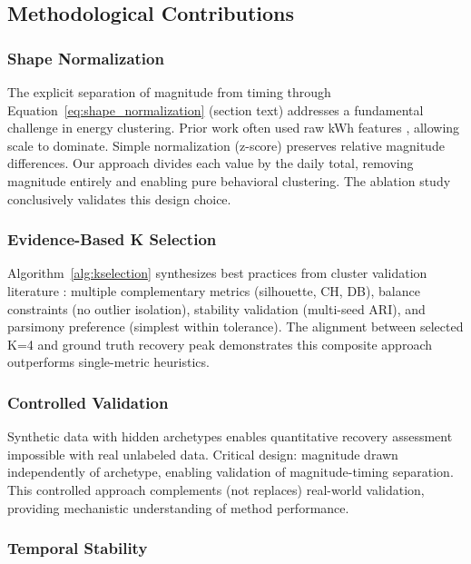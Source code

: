 \subsection{Methodological Contributions}

\subsubsection{Shape Normalization}

The explicit separation of magnitude from timing through Equation~\ref{eq:shape_normalization} (section text) addresses a fundamental challenge in energy clustering. Prior work often used raw kWh features \cite{kwac2014household,rhodes2014clustering}, allowing scale to dominate. Simple normalization (z-score) preserves relative magnitude differences. Our approach divides each value by the daily total, removing magnitude entirely and enabling pure behavioral clustering. The ablation study conclusively validates this design choice.

\subsubsection{Evidence-Based K Selection}

Algorithm~\ref{alg:kselection} synthesizes best practices from cluster validation literature \cite{hennig2020comparing,gates2019adjusted}: multiple complementary metrics (silhouette, CH, DB), balance constraints (no outlier isolation), stability validation (multi-seed ARI), and parsimony preference (simplest within tolerance). The alignment between selected K=4 and ground truth recovery peak demonstrates this composite approach outperforms single-metric heuristics.

\subsubsection{Controlled Validation}

Synthetic data with hidden archetypes enables quantitative recovery assessment impossible with real unlabeled data. Critical design: magnitude drawn independently of archetype, enabling validation of magnitude-timing separation. This controlled approach complements (not replaces) real-world validation, providing mechanistic understanding of method performance.

\subsubsection{Temporal Stability}

